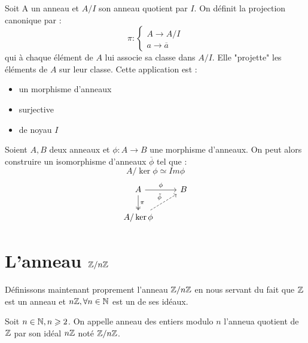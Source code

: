 \begin{definition}
    Soit A un anneau et $A/I$ son anneau quotient par $I$. 
    On définit la projection canonique par : 
        \[ \pi : 
            \begin{cases}
                A \longrightarrow A/I \\ 
                a \longrightarrow \overline{a} 
            \end{cases} \]
    qui à chaque élément de $A$ lui associe sa classe dans $A/I$. Elle "projette" les éléments de $A$ sur leur classe. 
    Cette application est : 
    \begin{itemize}
        \item un morphisme d'anneaux 
        \item surjective 
        \item de noyau $I$ 
    \end{itemize}
\end{definition}

\begin{theorem}[Isomorphisme]
    Soient $A,B$ deux anneaux et $\phi : A \longrightarrow B$ une morphisme d'anneaux. 
    On peut alors construire un isomorphisme d'anneaux $\overline{\phi}$ tel que : 
        \[ A / \ker \phi \simeq Im \phi \] 
    \[
        \begin{tikzcd}
            A \arrow[r, "\phi"] \arrow[d, two heads, "\pi"] & B \\
            A/\ker \phi \arrow[ur, "\tilde{\phi}", dashed] & 
        \end{tikzcd}
    \]
\end{theorem}



\section{L'anneau $\Z / n\Z$}

Définissons maintenant proprement l'anneau $\Z /n \Z$ en nous servant du fait que $\mathbb{Z}$ est un anneau 
et $ n \mathbb{Z}, \forall n \in \mathbb{N}$ est un de ses idéaux. 

\begin{definition}[Anneau $\Z / n \Z$]
    Soit $n \in \mathbb{N}, n \geqslant 2$. On appelle anneau des entiers modulo $n$ l'anneua quotient de $\mathbb{Z}$ 
    par son idéal $n\mathbb{Z}$ noté $\Z /n \Z$. 
\end{definition}


